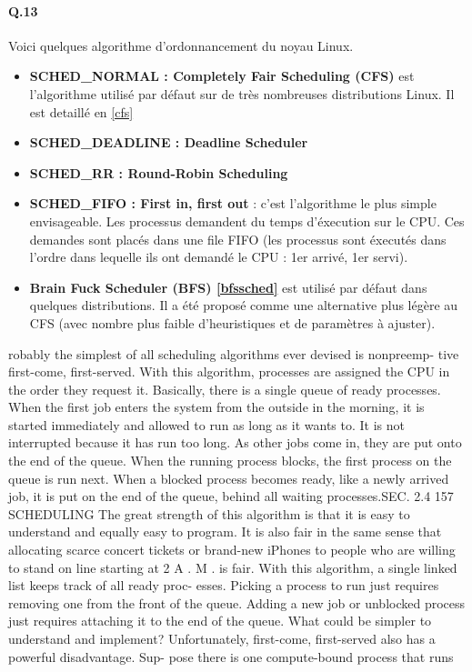 \documentclass[10pt]{article}
\begin{document}
  \paragraph{Q.13}
  Voici quelques algorithme d'ordonnancement du noyau Linux.
  
    \begin{itemize}
        \item \textbf{SCHED\_NORMAL : Completely Fair Scheduling (CFS)} est l'algorithme utilisé par défaut sur de très nombreuses distributions Linux.
        Il est detaillé en \ref{cfs}
        \item \textbf{SCHED\_DEADLINE : Deadline Scheduler}
        \item \textbf{SCHED\_RR : Round-Robin Scheduling}
        \item \textbf{SCHED\_FIFO : First in, first out} : c'est l'algorithme le plus simple envisageable.
        Les processus demandent du temps d'éxecution sur le CPU.
        Ces demandes sont placés dans une file FIFO (les processus sont éxecutés
        dans l'ordre dans lequelle ils ont demandé le CPU : 1er arrivé, 1er servi).
        \item \textbf{Brain Fuck Scheduler (BFS) \ref{bfssched}} est utilisé par défaut dans quelques distributions.
        Il a été proposé comme une alternative plus légère au CFS (avec nombre plus faible d'heuristiques et de paramètres à ajuster).
    \end{itemize}

robably the simplest of all scheduling algorithms ever devised is nonpreemp-
tive first-come, first-served. With this algorithm, processes are assigned the CPU
in the order they request it. Basically, there is a single queue of ready processes.
When the first job enters the system from the outside in the morning, it is started
immediately and allowed to run as long as it wants to. It is not interrupted because
it has run too long. As other jobs come in, they are put onto the end of the queue.
When the running process blocks, the first process on the queue is run next. When
a blocked process becomes ready, like a newly arrived job, it is put on the end of
the queue, behind all waiting processes.SEC. 2.4
157
SCHEDULING
The great strength of this algorithm is that it is easy to understand and equally
easy to program. It is also fair in the same sense that allocating scarce concert
tickets or brand-new iPhones to people who are willing to stand on line starting at
2 A . M . is fair. With this algorithm, a single linked list keeps track of all ready proc-
esses. Picking a process to run just requires removing one from the front of the
queue. Adding a new job or unblocked process just requires attaching it to the end
of the queue. What could be simpler to understand and implement?
Unfortunately, first-come, first-served also has a powerful disadvantage. Sup-
pose there is one compute-bound process that runs
\end{document}
